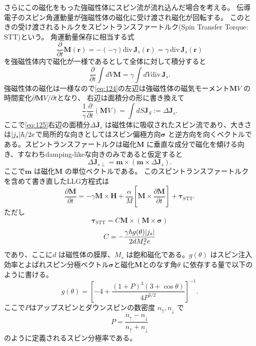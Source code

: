 \documentclass[dvipdfmx,11pt]{jsreport}
\numberwithin{equation}{chapter}
\numberwithin{table}{chapter}
\begin{document}
さらにこの磁化をもった強磁性体にスピン流が流れ込んだ場合を考える。
伝導電子のスピン角運動量が強磁性体の磁化に受け渡され磁化が回転する。
このときの受け渡されるトルクをスピントランスファートルク(Spin Transfer Torque: STT)という。
角運動量保存に相当する式
\begin{equation}
\label{eq:123}
\frac{\partial }{\partial t} \bm{M}(\bm{r})=-(-\gamma)\mathrm{div}\,\bm{J}_s(\bm{r})=\gamma\,\mathrm{div}\, \bm{J}_s(\bm{r}) 
\end{equation}
を強磁性体内で磁化が一様であるとして全体に対して積分すると
\begin{equation}
\label{eq:124}
	\frac{\partial }{\partial t} \int dV \bm{M}=\gamma \int dV \mathrm{div}\, \bm{J}_s
.\end{equation}
強磁性体の磁化は一様なので\eqref{eq:124}の左辺は強磁性体の磁気モーメント$\bm{M}V$ の時間変化$\partial \bm{M}V /\partial t$となり、
右辺は面積分の形に書き換えて
\begin{equation}
\label{eq:125}
	\frac{1}{\gamma}\frac{\partial }{\partial t} (\bm{M}V)=\int dS \bm{J}_S:=\Delta \bm{J}_s
.\end{equation}
ここで\eqref{eq:125}右辺の面積分$\Delta \bm{J}_s$ は磁性体に吸収されたスピン流であり、大きさは$\abs{j_s}\hbar /2e$で局所的な向きとしてはスピン偏極方向$\bm{\sigma}$ と逆方向を向くベクトルである。スピントランスファートルクは磁化$\bm{M}$ に垂直な成分で磁化を傾ける向き、すなわちdamping-likeな向きのみであると仮定すると
\begin{equation}
\label{eq:126}
	\Delta \bm{J}_{s\perp}=\bm{m}\times (\bm{m}\times \Delta \bm{J}_s)
.\end{equation}
ここで$\bm{m}$ は磁化$\bm{M}$ の単位ベクトルである。
このスピントランスファートルクを含めて書き直したLLG方程式は
\begin{equation}
\label{eq:127}
\frac{\partial \bm{M}}{\partial t} =-\gamma\bm{M}\times \bm{H}+\frac{\alpha}{M}\left[ \bm{M}\times \frac{\partial \bm{M}}{\partial t}  \right] +\bm{\tau}_\text{STT} 
.\end{equation}
ただし
\begin{equation}
\label{eq:128}
	\bm{\tau}_{\text{STT} }=C \bm{M}\times (\bm{M}\times \bm{\sigma})
\end{equation}
\begin{equation}
\label{eq:129}
	C=-\frac{\gamma\hbar g(\theta) \abs{j_s}}{2dM_s^2e}
\end{equation}
であり、ここに$d$ は磁性体の膜厚、$M_s$ は飽和磁化である。$g(\theta)$ はスピン注入効率とよばれスピン分極ベクトル$\bm{\sigma}$と磁化$\bm{M}$とのなす角$\theta$ に依存する量で以下のように書ける\cite{ku}。
\begin{equation}
\label{eq:s4}
	g(\theta)=\left[ -4+\frac{(1+P)^3(3+\cos \theta)}{4P^{3 /2}} \right] ^{-1}
.\end{equation}
ここで$P$はアップスピンとダウンスピンの数密度 $n_{\uparrow}, n_{\downarrow}$ で
\begin{equation}
\label{eq:s5}
P=\frac{n_{\uparrow}-n_{\downarrow}}{n_{\uparrow}+n_{\downarrow}}
\end{equation}
のように定義されるスピン分極率である。
\end{document}

